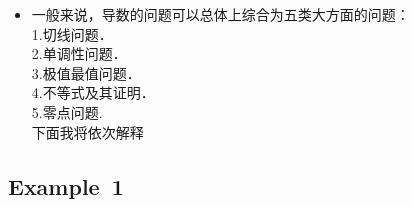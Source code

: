 \begin{itemize}
\item 一般来说，导数的问题可以总体上综合为五类大方面的问题：\\
1.切线问题．\\
2.单调性问题．\\
3.极值最值问题．\\
4.不等式及其证明．\\
5.零点问题.\\
下面我将依次解释
\end{itemize}
\subsection{Example~1}